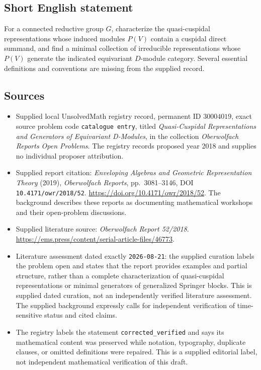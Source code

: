 \documentclass[11pt]{article}
\begin{document}
\subsection{Short English statement}
For a connected reductive group \(G\), characterize the quasi-cuspidal representations whose induced modules \(P(V)\) contain a cuspidal direct summand, and find a minimal collection of irreducible representations whose \(P(V)\) generate the indicated equivariant \(D\)-module category. Several essential definitions and conventions are missing from the supplied record.
\subsection{Sources}
\begin{itemize}
\item Supplied local UnsolvedMath registry record, permanent ID \(30004019\), exact source problem code \texttt{catalogue entry}, titled \emph{Quasi-Cuspidal Representations and Generators of Equivariant D-Modules}, in the collection \emph{Oberwolfach Reports Open Problems}. The registry records proposed year 2018 and supplies no individual proposer attribution.
\item Supplied report citation: \emph{Enveloping Algebras and Geometric Representation Theory} (2019), \emph{Oberwolfach Reports}, pp.\ 3081--3146, DOI \texttt{10.4171/owr/2018/52}. \url{https://doi.org/10.4171/owr/2018/52}. The background describes these reports as documenting mathematical workshops and their open-problem discussions.
\item Supplied literature source: \emph{Oberwolfach Report 52/2018}. \url{https://ems.press/content/serial-article-files/46773}.
\item Literature assessment dated exactly \texttt{2026-08-21}: the supplied curation labels the problem open and states that the report provides examples and partial structure, rather than a complete characterization of quasi-cuspidal representations or minimal generators of generalized Springer blocks. This is supplied dated curation, not an independently verified literature assessment. The supplied background expressly calls for independent verification of time-sensitive status and cited claims.
\item The registry labels the statement \texttt{corrected\_verified} and says its mathematical content was preserved while notation, typography, duplicate clauses, or omitted definitions were repaired. This is a supplied editorial label, not independent mathematical verification of this draft.
\end{itemize}
\end{document}
